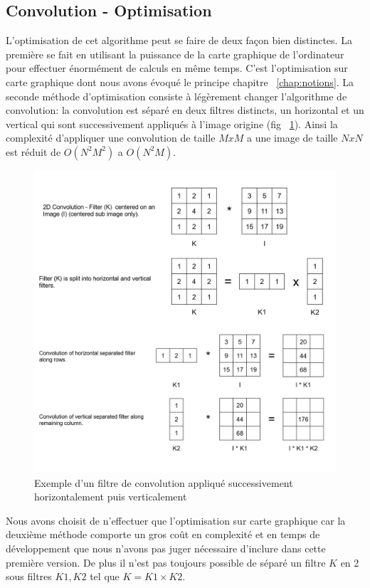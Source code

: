 \subsection{Convolution - Optimisation}
L'optimisation de cet algorithme peut se faire de deux façon bien distinctes. La première se fait en utilisant la puissance de la carte graphique de l'ordinateur pour effectuer énormément de calculs en même temps. C'est l'optimisation sur carte graphique dont nous avons évoqué le principe chapitre ~\ref{chap:notions}. La seconde méthode d'optimisation consiste à légèrement changer l'algorithme de convolution: la convolution est séparé en deux filtres distincts\cite{podlozhnyuk2007image}, un horizontal et un vertical qui sont successivement appliqués à l'image origine (fig ~\ref{fig:conv:separable}). Ainsi la complexité d'appliquer une convolution de taille $MxM$ a une image de taille $NxN$ est réduit de $O(N^2M^2)$ a $O(N^2M)$.

\begin{figure}[H]
\includegraphics[width=\linewidth]{images/separableconv}
\caption{Exemple d'un filtre de convolution appliqué successivement horizontalement puis verticalement}
\label{fig:conv:separable}
\end{figure}

Nous avons choisit de n'effectuer que l'optimisation sur carte graphique car la deuxième méthode comporte un gros coût en complexité et en temps de développement que nous n'avons pas juger nécessaire d'inclure dans cette première version. De plus il n'est pas toujours possible de séparé un filtre $K$ en 2 sous filtres $K1, K2$ tel que $K = K1 \times K2$.

